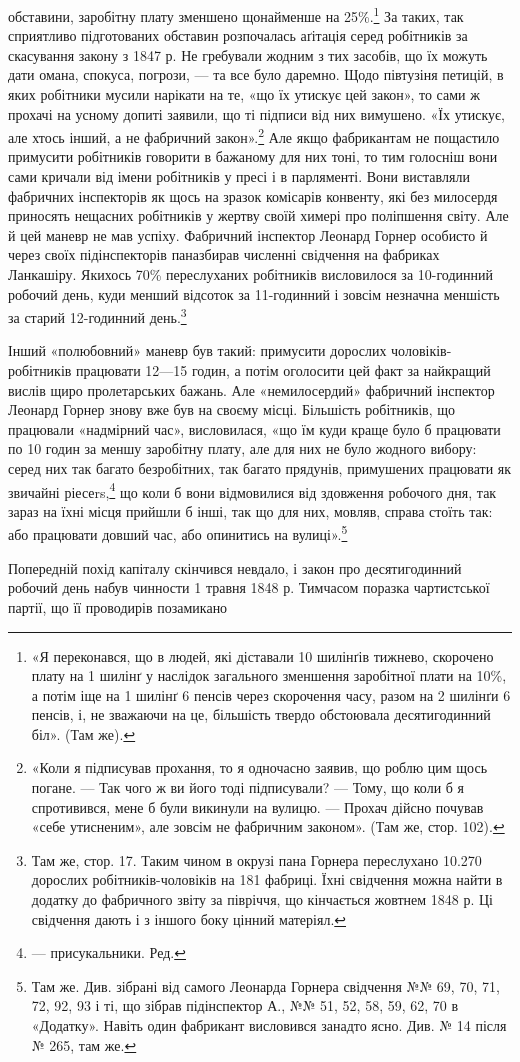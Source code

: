 обставини, заробітну плату зменшено щонайменше на 25\%.\footnote{
«Я переконався, що в людей, які діставали 10 шилінґів тижнево,
скорочено плату на 1 шилінґ у наслідок загального зменшення заробітної
плати на 10\%, а потім іще на 1 шилінґ 6 пенсів через скорочення часу,
разом на 2 шилінґи 6 пенсів, і, не зважаючи на це, більшість твердо обстоювала
десятигодинний біл». (Там же).
}
За таких, так сприятливо підготованих обставин розпочалась
аґітація серед робітників за скасування закону з 1847 р. Не гребували
жодним з тих засобів, що їх можуть дати омана, спокуса,
погрози, — та все було даремно. Щодо півтузіня петицій, в яких
робітники мусили нарікати на те, «що їх утискує цей закон», то
сами ж прохачі на усному допиті заявили, що ті підписи від них
вимушено. «Їх утискує, але хтось інший, а не фабричний закон».\footnote{
«Коли я підписував прохання, то я одночасно заявив, що роблю
цим щось погане. — Так чого ж ви його тоді підписували? — Тому, що коли б
я спротивився, мене б були викинули на вулицю. — Прохач дійсно почував
«себе утисненим», але зовсім не фабричним законом». (Там же, стор. 102).
}
Але якщо фабрикантам не пощастило примусити робітників
говорити в бажаному для них тоні, то тим голосніш вони сами
кричали від імени робітників у пресі і в парляменті. Вони виставляли
фабричних інспекторів як щось на зразок комісарів конвенту,
які без милосердя приносять нещасних робітників у жертву
своїй химері про поліпшення світу. Але й цей маневр не мав
успіху. Фабричний інспектор Леонард Горнер особисто й через
своїх підінспекторів паназбирав численні свідчення на фабриках
Ланкашіру. Якихось 70\% переслуханих робітників висловилося
за 10-годинний робочий день, куди менший відсоток за 11-годинний
і зовсім незначна меншість за старий 12-годинний день.\footnote{
Там же, стор. 17. Таким чином в окрузі пана Горнера переслухано
10.270 дорослих робітників-чоловіків на 181 фабриці. Їхні свідчення
можна найти в додатку до фабричного звіту за півріччя, що кінчається
жовтнем 1848 р. Ці свідчення дають і з іншого боку цінний матеріял.
}

Інший «полюбовний» маневр був такий: примусити дорослих
чоловіків-робітників працювати 12—15 годин, а потім оголосити
цей факт за найкращий вислів щиро пролетарських бажань.
Але «немилосердий» фабричний інспектор Леонард Горнер знову
вже був на своєму місці. Більшість робітників, що працювали
«надмірний час», висловилася, «що їм куди краще було б працювати
по 10 годин за меншу заробітну плату, але для них не було
жодного вибору: серед них так багато безробітних, так багато
прядунів, примушених працювати як звичайні ріесеrs,\footnote*{
— присукальники. Ред.
} що
коли б вони відмовилися від здовження робочого дня, так зараз
на їхні місця прийшли б інші, так що для них, мовляв, справа
стоїть так: або працювати довший час, або опинитись на вулиці».\footnote{
Там же. Див. зібрані від самого Леонарда Горнера свідчення
№№ 69, 70, 71, 72, 92, 93 і ті, що зібрав підінспектор А., №№ 51, 52,
58, 59, 62, 70 в «Додатку». Навіть один фабрикант висловився занадто
ясно. Див. № 14 після № 265, там же.
}

Попередній похід капіталу скінчився невдало, і закон про десятигодинний
робочий день набув чинности 1 травня 1848 р. Тимчасом
поразка чартистської партії, що її проводирів позамикано